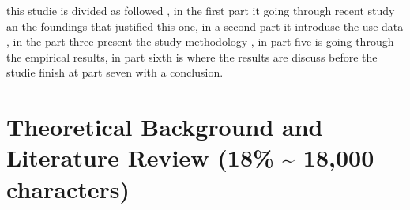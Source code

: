 \documentclass[12pt]{scrartcl}
\numberwithin{equation}{section}				%
\begin{document}
    this studie is divided as followed ,  in the first part it going through recent study an the foundings that justified this one,  in a second part it introduse the use data , in the part three  present the study methodology , in part five is going through the empirical results, in part sixth is where the results are discuss  before the studie finish at part seven with a conclusion.  
    
    
     
    
    
    \section{Theoretical Background and Literature Review (18\% \; \textasciitilde{} 18,000 characters)}
    
    
    
    
\end{document}
